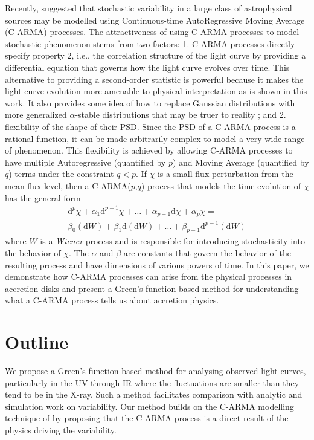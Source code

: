 \documentclass[a4paper,fleqn,usenatbib]{mnras}
\begin{document}
Recently, \citet{Kelly14} suggested that stochastic variability in a large class of astrophysical sources may be modelled using Continuous-time AutoRegressive Moving Average (C-ARMA) processes. The attractiveness of using C-ARMA processes to model stochastic phenomenon stems from two factors: 1. C-ARMA processes directly specify property 2, i.e., the correlation structure of the light curve by providing a differential equation that governs how the light curve evolves over time. This alternative to providing a second-order statistic is powerful because it makes the light curve evolution more amenable to physical interpretation as is shown in this work. It also provides some idea of how to replace Gaussian distributions with more generalized $\alpha$-stable distributions that may be truer to reality \citep{BrockwellMarquardt05, BrockwellLinder09}; and 2. flexibility of the shape of their PSD. Since the PSD of a C-ARMA process is a rational function, it can be made arbitrarily complex to model a very wide range of phenomenon. This flexibility is achieved by allowing C-ARMA processes to have multiple Autoregressive (quantified by $p$) and Moving Average (quantified by $q$) terms under the constraint $q < p$. If $\chi$ is a small flux perturbation from the mean flux level, then a C-ARMA($p$,$q$) process that models the time evolution of $\chi$ has the general form
\begin{multline}\label{eq:CARMAIntro}
\mathrm{d}^{p}\chi + \alpha_{1} \mathrm{d}^{p-1}\chi + \ldots + \alpha_{p-1} \mathrm{d}\chi + \alpha_{p} \chi = \\ \beta_{0} (\mathrm{d}W) + \beta_{1} \mathrm{d}(\mathrm{d}W) + \ldots + \beta_{p-1} \mathrm{d}^{p-1}(\mathrm{d}W)
\end{multline}
where $W$ is a \textit{Wiener} process and is responsible for introducing stochasticity into the behavior of $\chi$. The $\alpha$ and $\beta$ are constants that govern the behavior of the resulting process and have dimensions of various powers of time. In this paper, we demonstrate how C-ARMA processes can arise from the physical processes in accretion disks and present a Green's function-based method for understanding what a C-ARMA process tells us about accretion physics.

\section[Outline]{Outline}\label{sec:Outline}

We propose a Green's function-based method for analysing observed light curves, particularly in the UV through IR where the fluctuations are smaller than they tend to be in the X-ray. Such a method facilitates comparison with analytic and simulation work on variability. Our method builds on the C-ARMA modelling technique of \citet{Kelly14} by proposing that the C-ARMA process is a direct result of the physics driving the variability. 
\end{document}
